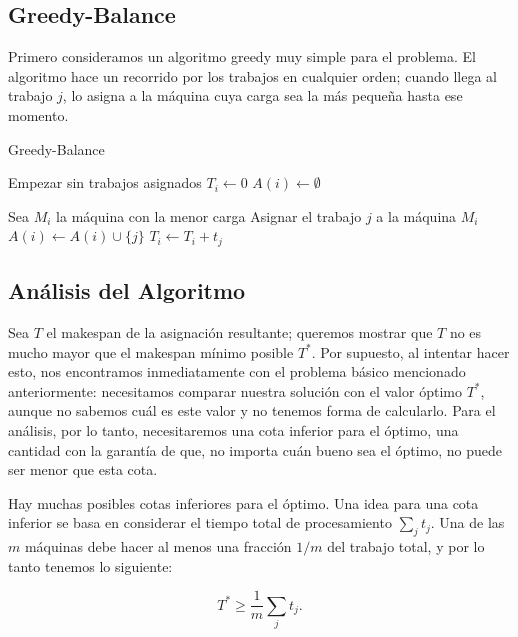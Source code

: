 \documentclass{report}
\begin{document}
	
	\subsection*{Greedy-Balance}
	
	Primero consideramos un algoritmo greedy muy simple para el problema. El algoritmo hace un recorrido por los trabajos en cualquier orden; cuando llega al trabajo \( j \), lo asigna a la máquina cuya carga sea la más pequeña hasta ese momento.
	

\begin{algorithm}[H]
	\caption{Greedy-Balance}
	\label{alg:greedy-balance}
		\State Empezar sin trabajos asignados
		\State \( T_i \gets 0 \) 
		\State \( A(i) \gets \emptyset \) 
		\EndFor
		
		\State Sea \( M_i \) la máquina con la menor carga
		\State Asignar el trabajo \( j \) a la máquina \( M_i \)
		\State \( A(i) \gets A(i) \cup \{j\} \)
		\State \( T_i \gets T_i + t_j \)
		\EndFor
\end{algorithm}

	
	\subsection*{Análisis del Algoritmo}
	
	Sea \( T \) el makespan de la asignación resultante; queremos mostrar que \( T \) no es mucho mayor que el makespan mínimo posible \( T^* \). Por supuesto, al intentar hacer esto, nos encontramos inmediatamente con el problema básico mencionado anteriormente: necesitamos comparar nuestra solución con el valor óptimo \( T^* \), aunque no sabemos cuál es este valor y no tenemos forma de calcularlo. Para el análisis, por lo tanto, necesitaremos una cota inferior para el óptimo, una cantidad con la garantía de que, no importa cuán bueno sea el óptimo, no puede ser menor que esta cota.
	
	Hay muchas posibles cotas inferiores para el óptimo. Una idea para una cota inferior se basa en considerar el tiempo total de procesamiento \( \sum_j t_j \). Una de las \( m \) máquinas debe hacer al menos una fracción \( 1/m \) del trabajo total, y por lo tanto tenemos lo siguiente:
	
	\begin{equation} \label{eq:lower-bound-1}
		T^* \geq \frac{1}{m} \sum_j t_j.
	\end{equation}
	
\end{document}
